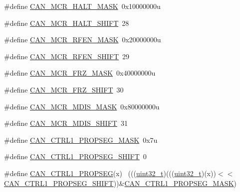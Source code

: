 \begin{DoxyCompactItemize}
\item 
\#define \hyperlink{group___c_a_n___register___masks_gad5282ba01498ad05fa9ce4387050f1df}{C\+A\+N\+\_\+\+M\+C\+R\+\_\+\+H\+A\+L\+T\+\_\+\+M\+A\+SK}~0x10000000u
\item 
\#define \hyperlink{group___c_a_n___register___masks_gab976a082962ddeb0a7738bc5385b35da}{C\+A\+N\+\_\+\+M\+C\+R\+\_\+\+H\+A\+L\+T\+\_\+\+S\+H\+I\+FT}~28
\item 
\#define \hyperlink{group___c_a_n___register___masks_ga55cd060ac6cdad670aeb97522a118930}{C\+A\+N\+\_\+\+M\+C\+R\+\_\+\+R\+F\+E\+N\+\_\+\+M\+A\+SK}~0x20000000u
\item 
\#define \hyperlink{group___c_a_n___register___masks_gaffab6b0e09ace8e09cb1487dd6639955}{C\+A\+N\+\_\+\+M\+C\+R\+\_\+\+R\+F\+E\+N\+\_\+\+S\+H\+I\+FT}~29
\item 
\#define \hyperlink{group___c_a_n___register___masks_ga1b55e4024cec7ad30bcba945a70c3383}{C\+A\+N\+\_\+\+M\+C\+R\+\_\+\+F\+R\+Z\+\_\+\+M\+A\+SK}~0x40000000u
\item 
\#define \hyperlink{group___c_a_n___register___masks_gae3aac50a6bba3516d60fd881e8a8b069}{C\+A\+N\+\_\+\+M\+C\+R\+\_\+\+F\+R\+Z\+\_\+\+S\+H\+I\+FT}~30
\item 
\#define \hyperlink{group___c_a_n___register___masks_gaadea43214ec6dcbab21d59988ae401bb}{C\+A\+N\+\_\+\+M\+C\+R\+\_\+\+M\+D\+I\+S\+\_\+\+M\+A\+SK}~0x80000000u
\item 
\#define \hyperlink{group___c_a_n___register___masks_ga15f1bf3b87536155c2b13f279b06ba93}{C\+A\+N\+\_\+\+M\+C\+R\+\_\+\+M\+D\+I\+S\+\_\+\+S\+H\+I\+FT}~31
\item 
\#define \hyperlink{group___c_a_n___register___masks_ga0541429f7e3d35ec374c462a83c3ef49}{C\+A\+N\+\_\+\+C\+T\+R\+L1\+\_\+\+P\+R\+O\+P\+S\+E\+G\+\_\+\+M\+A\+SK}~0x7u
\item 
\#define \hyperlink{group___c_a_n___register___masks_ga7eada40e9f9aafd9d58c38b3a3b295b5}{C\+A\+N\+\_\+\+C\+T\+R\+L1\+\_\+\+P\+R\+O\+P\+S\+E\+G\+\_\+\+S\+H\+I\+FT}~0
\item 
\#define \hyperlink{group___c_a_n___register___masks_ga44e0e76a89da9ed9a1e5d71deb8f3d54}{C\+A\+N\+\_\+\+C\+T\+R\+L1\+\_\+\+P\+R\+O\+P\+S\+EG}(x)                                      ~(((\hyperlink{_p_e___types_8h_a33594304e786b158f3fb30289278f5af}{uint32\+\_\+t})(((\hyperlink{_p_e___types_8h_a33594304e786b158f3fb30289278f5af}{uint32\+\_\+t})(x))$<$$<$\hyperlink{group___c_a_n___register___masks_ga7eada40e9f9aafd9d58c38b3a3b295b5}{C\+A\+N\+\_\+\+C\+T\+R\+L1\+\_\+\+P\+R\+O\+P\+S\+E\+G\+\_\+\+S\+H\+I\+FT}))\&\hyperlink{group___c_a_n___register___masks_ga0541429f7e3d35ec374c462a83c3ef49}{C\+A\+N\+\_\+\+C\+T\+R\+L1\+\_\+\+P\+R\+O\+P\+S\+E\+G\+\_\+\+M\+A\+SK})
$$
\end{DoxyCompactItemize}
